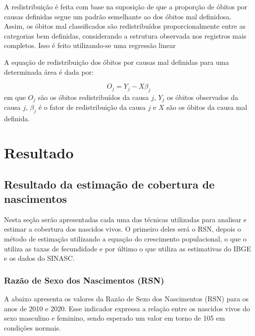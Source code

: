 \documentclass[
  12pt,
  a4paper,
]{scrreprt}
\begin{document}
\vspace{12pt}

A redistribuição é feita com base na suposição de que a proporção de
óbitos por causas definidas segue um padrão semelhante ao dos óbitos mal
definidosa. Assim, os óbitos mal classificados são redistribuídos
proporcionalmente entre as categorias bem definidas, considerando a
estrutura observada nos registros mais completos. Isso é feito
utilizando-se uma regressão linear

\vspace{12pt}

A equação de redistribuição dos óbitos por causas mal definidas para uma
determinada área é dada por:

\[
O_j = Y_j - X \beta_{j}
\] em que \(O_j\) são os óbitos redistribuídos da causa \(j\), \(Y_j\)
os óbitos observados da causa \(j\), \(\beta_j\) é o fator de
redistribuição da causa \(j\) e \(X\) são os óbitos da causa mal
definida.

\chapter{Resultado}\label{resultado}

\section{Resultado da estimação de cobertura de
nascimentos}\label{resultado-da-estimauxe7uxe3o-de-cobertura-de-nascimentos}

Nesta seção serão apresentadas cada uma das técnicas utilizadas para
analisar e estimar a cobertura dos nascidos vivos. O primeiro deles será
o RSN, depois o método de estimação utilizando a equação do crescimento
populacional, o que o utiliza as taxas de fecundidade e por último o que
utiliza as estimativas do IBGE e os dados do SINASC.

\subsection{Razão de Sexo dos Nascimentos
(RSN)}\label{razuxe3o-de-sexo-dos-nascimentos-rsn-1}

A abaixo apresenta os valores da Razão de Sexo dos Nascimentos (RSN)
para os anos de 2010 e 2020. Esse indicador expressa a relação entre os
nascidos vivos do sexo masculino e feminino, sendo esperado um valor em
torno de 105 em condições normais.
\end{document}

